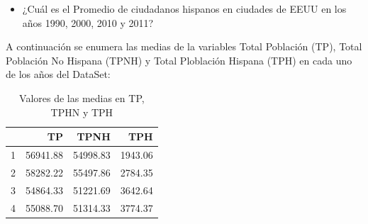 \documentclass[conference]{IEEEtran}\usepackage[]{graphicx}\usepackage[]{color}
\begin{document}
\begin{itemize}
\item ¿Cuál es el Promedio de ciudadanos hispanos en ciudades de EEUU en los años 1990, 2000, 2010 y 2011?
\end{itemize}

A continuación se enumera las medias de la variables Total Población (TP), Total Población  No Hispana (TPNH) y Total Ploblación Hispana (TPH) en cada uno de los años del DataSet:
\vspace{-1mm}
\begin{table}[ht]
\centering
\begin{tabular}{rrrr}
  \hline
 & TP & TPNH & TPH \\ 
  \hline
1 & 56941.88 & 54998.83 & 1943.06 \\ 
  2 & 58282.22 & 55497.86 & 2784.35 \\ 
  3 & 54864.33 & 51221.69 & 3642.64 \\ 
  4 & 55088.70 & 51314.33 & 3774.37 \\ 
   \hline
\end{tabular}
\caption{Valores de las medias en TP, TPHN y TPH} 
\end{table}





\end{document}
